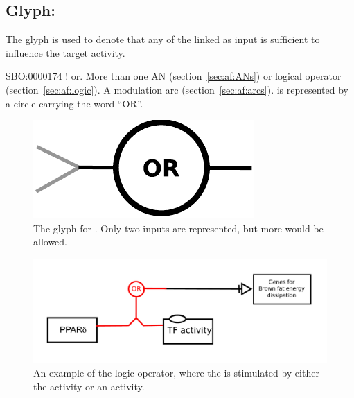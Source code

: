 \subsection{Glyph: }
\label{sec:af:or}

The glyph  is used to denote that any of the  linked as input is sufficient to influence the target activity.

\begin{glyphDescription}
 \glyphSboTerm SBO:0000174 ! or.
 \glyphOrigin More than one AN (section~\ref{sec:af:ANs}) or logical operator (section~\ref{sec:af:logic}).
 \glyphTarget  A modulation arc (section~\ref{sec:af:arcs}). 
 \glyphNode {} is represented by a circle carrying the word ``OR''.
 \end{glyphDescription}

\begin{figure}[H]
  \centering
  \includegraphics[scale = 0.5]{images/or}
  \caption{The \AF glyph for . Only two inputs are represented, but more would be allowed.}
  \label{fig:af:or}
\end{figure}


\begin{figure}[H]
  \centering
  \includegraphics[scale = 0.5]{examples/ex-or}
  \caption{An example of the  logic operator, where the  is stimulated by either the  activity or an  activity.}
  \label{fig:af:ex-or}
\end{figure}
